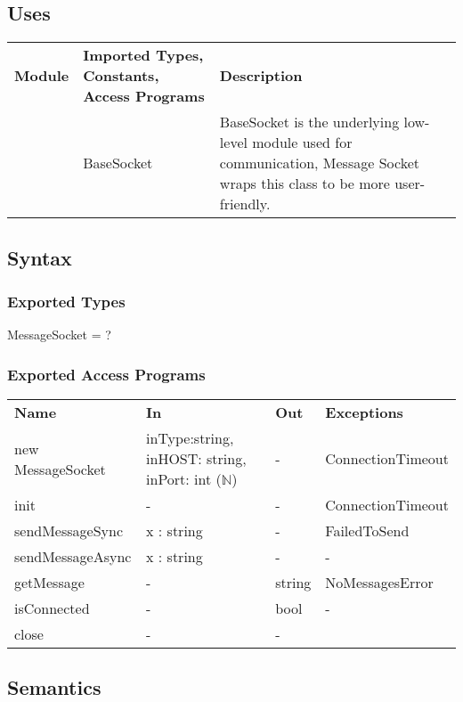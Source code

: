 \documentclass[12pt, titlepage]{article}
\begin{document}
\subsection{Uses}
\begin{center}
\begin{tabular}{p{2 cm} p{5cm} p{5.5cm} }
\hline
\textbf{Module} & \textbf{Imported Types, Constants, Access Programs} & \textbf{Description}  \\
\nameref{Base Socket} & BaseSocket & BaseSocket is the underlying low-level module used for communication, Message Socket wraps this class to be more user-friendly.  \\
\hline
\hline
\end{tabular}
\end{center}
\subsection{Syntax}
\subsubsection{Exported Types}
MessageSocket =  ?
\subsubsection{Exported Access Programs}
\begin{center}
\begin{tabular}{p{3.5cm} p{2.5cm} p{2.5cm} p{5cm}}
\hline
\textbf{Name} & \textbf{In} & \textbf{Out} & \textbf{Exceptions} \\
new MessageSocket & inType:string, inHOST: string, inPort: int ($\mathbb{N}$) & - & ConnectionTimeout \\
\hline
init & - & - & ConnectionTimeout \\
\hline
sendMessageSync & x : string & - & FailedToSend \\
\hline
sendMessageAsync & x : string & - & - \\
\hline
getMessage & - & string & NoMessagesError \\
\hline
isConnected & - & bool & - \\
\hline
close & - & - & \\
\hline
\hline
\end{tabular}
\end{center}
\subsection{Semantics}
\end{document}
